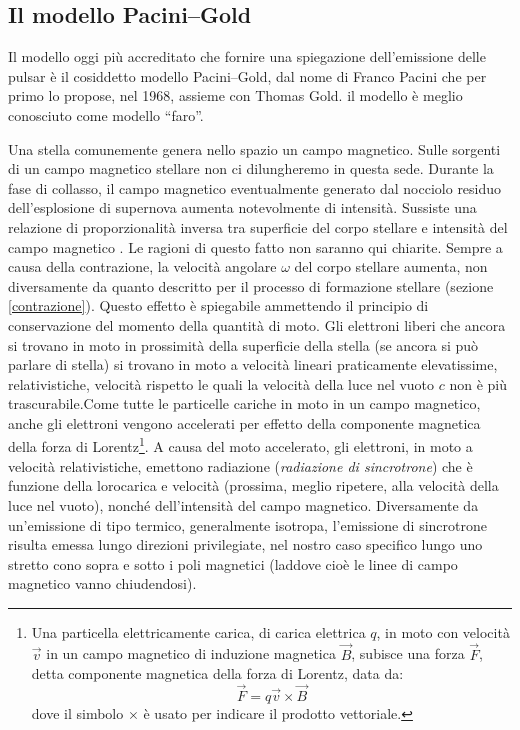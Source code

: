\subsection{Il modello Pacini--Gold}\label{faro}
Il modello oggi più accreditato che fornire una spiegazione dell'emissione delle pulsar è il cosiddetto modello Pacini--Gold, dal nome di Franco Pacini che per primo lo propose, nel 1968, assieme con Thomas Gold. il modello è meglio conosciuto come modello ``faro''.
\par
Una stella comunemente genera nello spazio un campo magnetico. Sulle sorgenti di un campo magnetico stellare non ci dilungheremo in questa sede.
Durante la fase di collasso, il campo magnetico eventualmente  generato dal nocciolo residuo dell'esplosione di supernova aumenta notevolmente di intensit\`{a}. Sussiste una relazione di proporzionalit\`{a} inversa tra superficie del corpo stellare e intensit\`{a} del campo magnetico \citep{hack}. Le ragioni di questo fatto non saranno qui chiarite.
Sempre a causa della contrazione, la velocit\`{a} angolare $\omega$ del corpo stellare aumenta, non diversamente da quanto descritto per il processo di formazione stellare (sezione \ref{contrazione}). Questo effetto è spiegabile ammettendo il principio di conservazione del momento della quantit\`{a} di moto.
Gli elettroni liberi che ancora si trovano in moto in prossimit\`{a} della superficie della stella (se ancora si può parlare di stella) si trovano in moto a velocit\`{a} lineari praticamente elevatissime, relativistiche, velocit\`{a} rispetto le quali la velocit\`{a} della luce nel vuoto $c$ non è più trascurabile.Come tutte le particelle cariche in moto in un campo magnetico, anche gli elettroni vengono accelerati per effetto della componente magnetica della forza di Lorentz\footnote{Una particella elettricamente carica, di carica elettrica $q$, in moto con velocit\`{a} $\vec{v}$ in un campo magnetico di induzione magnetica $\vec{B}$, subisce una forza $\vec{F}$, detta componente magnetica della forza di Lorentz, data da:
\begin{displaymath}
\vec{F}=q \vec{v} \times \vec{B}
\end{displaymath}
dove il simbolo $\times$ è usato per indicare il prodotto vettoriale.}.
A causa del moto accelerato, gli elettroni, in moto a velocit\`{a} relativistiche, emettono radiazione (\emph{radiazione di sincrotrone}) che è funzione della lorocarica e velocit\`{a} (prossima, meglio ripetere, alla velocit\`{a} della luce nel vuoto), nonché dell'intensit\`{a} del campo magnetico.
Diversamente da un'emissione di tipo termico, generalmente isotropa, l'emissione di sincrotrone risulta emessa lungo direzioni privilegiate, nel nostro caso specifico  lungo uno stretto cono sopra e sotto i poli magnetici (laddove cioè le linee di campo magnetico vanno chiudendosi).
